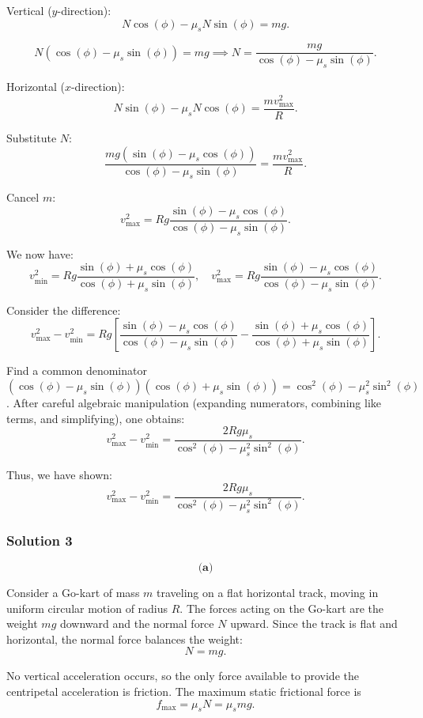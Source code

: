 \documentclass{article}
\begin{document}
Vertical ($y$-direction):
\[
N \cos(\phi) - \mu_s N \sin(\phi) = mg.
\]

\[
N(\cos(\phi) - \mu_s \sin(\phi)) = mg \implies N = \frac{mg}{\cos(\phi) - \mu_s \sin(\phi)}.
\]

Horizontal ($x$-direction):
\[
N \sin(\phi) - \mu_s N \cos(\phi) = \frac{mv_{\text{max}}^2}{R}.
\]

Substitute $N$:
\[
\frac{mg(\sin(\phi) - \mu_s \cos(\phi))}{\cos(\phi) - \mu_s \sin(\phi)} = \frac{mv_{\text{max}}^2}{R}.
\]

Cancel $m$:
\[
v_{\text{max}}^2 = R g \frac{\sin(\phi) - \mu_s \cos(\phi)}{\cos(\phi) - \mu_s \sin(\phi)}.
\]

We now have:
\[
v_{\text{min}}^2 = R g \frac{\sin(\phi) + \mu_s \cos(\phi)}{\cos(\phi) + \mu_s \sin(\phi)}, \quad 
v_{\text{max}}^2 = R g \frac{\sin(\phi) - \mu_s \cos(\phi)}{\cos(\phi) - \mu_s \sin(\phi)}.
\]

Consider the difference:
\[
v_{\text{max}}^2 - v_{\text{min}}^2 = R g \left[\frac{\sin(\phi) - \mu_s \cos(\phi)}{\cos(\phi) - \mu_s \sin(\phi)} - \frac{\sin(\phi) + \mu_s \cos(\phi)}{\cos(\phi) + \mu_s \sin(\phi)}\right].
\]

Find a common denominator $(\cos(\phi) - \mu_s \sin(\phi))(\cos(\phi) + \mu_s \sin(\phi)) = \cos^2(\phi) - \mu_s^2 \sin^2(\phi)$. After careful algebraic manipulation (expanding numerators, combining like terms, and simplifying), one obtains:
\[
v_{\text{max}}^2 - v_{\text{min}}^2 = \frac{2 R g \mu_s}{\cos^2(\phi) - \mu_s^2 \sin^2(\phi)}.
\]

Thus, we have shown:
\[
\boxed{v_{\text{max}}^2 - v_{\text{min}}^2 = \frac{2R g \mu_s}{\cos^2(\phi) - \mu_s^2 \sin^2(\phi)}.}
\]

\subsubsection{Solution 3}

\[
\textbf{(a)}
\]

Consider a Go-kart of mass $m$ traveling on a flat horizontal track, moving in uniform circular motion of radius $R$. The forces acting on the Go-kart are the weight $mg$ downward and the normal force $N$ upward. Since the track is flat and horizontal, the normal force balances the weight:
\[
N = mg.
\]

No vertical acceleration occurs, so the only force available to provide the centripetal acceleration is friction. The maximum static frictional force is
\[
f_{\text{max}} = \mu_s N = \mu_s mg.
\]
\end{document}
